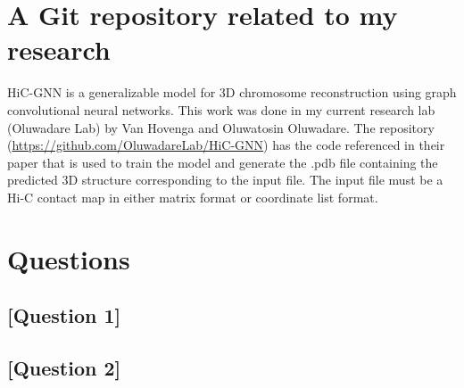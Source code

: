 \documentclass{article}
\begin{document}
\section{A Git repository related to my research}

HiC-GNN is a generalizable model for 3D chromosome reconstruction using graph convolutional neural networks. This work was done in my current research lab (Oluwadare Lab) by Van Hovenga and Oluwatosin Oluwadare. The repository (\url{https://github.com/OluwadareLab/HiC-GNN}) has the code referenced in their paper that is used to train the model and generate the .pdb file containing the predicted 3D structure corresponding to the input file. The input file must be a Hi-C contact map in either matrix format or coordinate list format.


\section{Questions}

\subsection{[Question 1]}

\subsection{[Question 2]}
\end{document}
